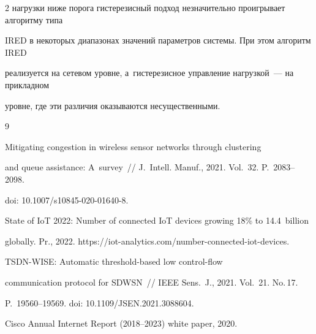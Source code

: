 \begin{multicols}{2}
нагрузки ниже порога гистерезисный подход незначительно проигрывает алгоритму типа 


IRED в некоторых диапазонах значений параметров системы. При этом алгоритм IRED 


реализуется на сетевом уровне, а~гистерезисное управ\-ле\-ние нагрузкой~--- на при\-клад\-ном 


уровне, где эти различия оказываются несущественными.





\vspace*{-7pt}





{\small\frenchspacing


 {%




 \begin{thebibliography}{9}


 


 \vspace*{-2pt}


 




 Mitigating congestion in wireless sensor networks through clustering 


and queue assistance: A~survey~// J.~Intell. Manuf., 2021. Vol.~32. P.~2083--2098. 


doi: 10.1007/s10845-020-01640-8.




 State of IoT 2022: Number of connected IoT devices growing 18\% to 14.4~billion 


globally. Pr., 2022. {\sf https://iot-analytics.com/number-connected-iot-devices}.




 TSDN-WISE: Automatic threshold-based low control-flow 


communication protocol for SDWSN~// IEEE Sens.~J., 2021. Vol.~21. No.\,17.  


P.~19560--19569. doi: 10.1109/JSEN.2021.3088604.




Cisco Annual Internet Report (2018--2023) white paper, 2020. {\sf 


}
\end{thebibliography}}}
\end{multicols}
